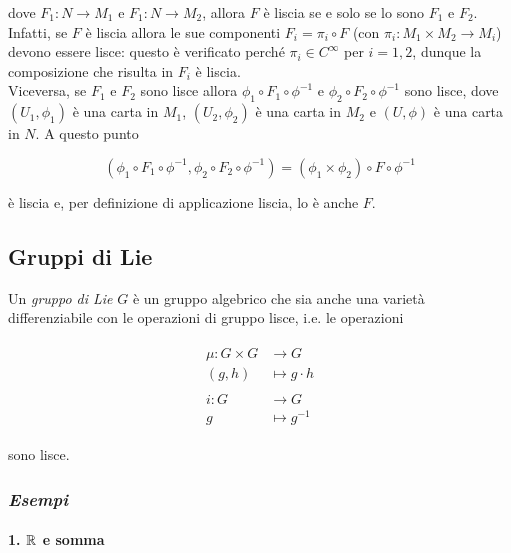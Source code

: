 dove $ F_{1} : N \to M_{1} $ e $ F_{1} : N \to M_{2} $, allora $ F $ è liscia se e solo se lo sono $ F_{1} $ e $ F_{2} $.\\
Infatti, se $ F $ è liscia allora le sue componenti $ F_{i} = \pi_{i} \circ F $ (con $ \pi_{i} : M_{1} \times M_{2} \to M_{i} $) devono essere lisce: questo è verificato perché $ \pi_{i} \in C^{\infty} $ per $ i=1,2 $, dunque la composizione che risulta in $ F_{i} $ è liscia.\\
Viceversa, se $ F_{1} $ e $ F_{2} $ sono lisce allora $ \phi_{1} \circ F_{1} \circ \phi^{-1} $ e $ \phi_{2} \circ F_{2} \circ \phi^{-1} $ sono lisce, dove $ (U_{1},\phi_{1}) $ è una carta in $ M_{1} $, $ (U_{2},\phi_{2}) $ è una carta in $ M_{2} $ e $ (U,\phi) $ è una carta in $ N $. A questo punto

\begin{equation}
	(\phi_{1} \circ F_{1} \circ \phi^{-1}, \phi_{2} \circ F_{2} \circ \phi^{-1}) = (\phi_{1} \times \phi_{2}) \circ F \circ \phi^{-1}
\end{equation}

è liscia e, per definizione di applicazione liscia, lo è anche $ F $.

\subsection{Gruppi di Lie}

Un \textit{gruppo di Lie} $ G $ è un gruppo algebrico che sia anche una varietà differenziabile con le operazioni di gruppo lisce, i.e. le operazioni

\begin{align}
	\begin{split}
		\mu : G \times G &\to G\\
		(g,h) &\mapsto g \cdot h\\\\
		i : G &\to G\\
		g &\mapsto g^{-1}
	\end{split}
\end{align}

sono lisce.

\subsubsection{\textit{Esempi}}

\paragraph{1. $ \mathbb{R} $ e somma}

